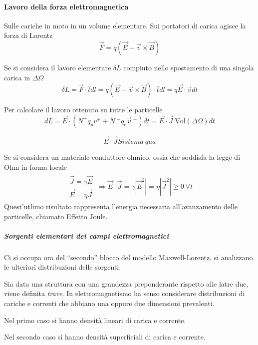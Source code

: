 \paragraph{Lavoro della forza elettromagnetica} Sulle cariche in moto in un volume elementare.
Sui portatori di carica agisce la forza di Lorentz
$$
\vec{F} = q\left(\vec{E}+\vec{v}\times\vec{B}\right)
$$

Se si considera il lavoro elementare $\delta L$ compiuto nello spostamento di una singola carica in
$\Delta\Omega$
$$
\delta L = \vec{F}\cdot\hat{t}dl = q\left(\vec{E}+\vec{v}\times\vec{B}\right)\cdot \hat{t} dl = q\vec{E}\cdot\vec{v}dt
$$

Per calcolare il lavoro ottenuto su tutte le particelle
$$
dL = \vec{E}\cdot\left(N^+q_pv^+ + N\ ^-q_e\vec{v}\ ^-\right)dt = \vec{E}\cdot\vec{J}\ \text{Vol}(\Delta\Omega)dt
$$

$$
\vec{E}\cdot\vec{J} Sistema\ qua
$$

Se si considera un materiale conduttore ohmico, ossia che soddisfa la legge di Ohm in forma locale
\begin{align*}
\begin{matrix}
\vec{J} = \gamma\vec{E} \\
\vec{E} = \eta\vec{J}
\end{matrix}\ 
\Rightarrow \vec{E}\cdot\vec{J} = \gamma\left|\vec{E}^2\right|
= \eta\left|\vec{J}^2\right| \geq 0 \ \forall t
\end{align*}
Quest'utlimo risultato rappresenta l'energia necessaria all'avanzamento delle particelle, chiamato
Effetto Joule.


\subparagraph{Sorgenti elementari dei campi elettromagnetici}
Ci si occupa ora del ``secondo'' blocco del modello Maxwell-Lorentz, si analizzano le ulteriori 
distribuzioni delle sorgenti:

Sia data una struttura con una grandezza preponderante rispetto alle latre due, viene definita 
\textit{trave}.
In elettromagnetismo ha senso considerare distribuzioni di cariche e correnti che abbiano una oppure
due dimensioni prevalenti.

Nel primo caso si hanno densità lineari di carica e corrente.

Nel secondo caso si hanno densità superficiali di carica e corrente.

